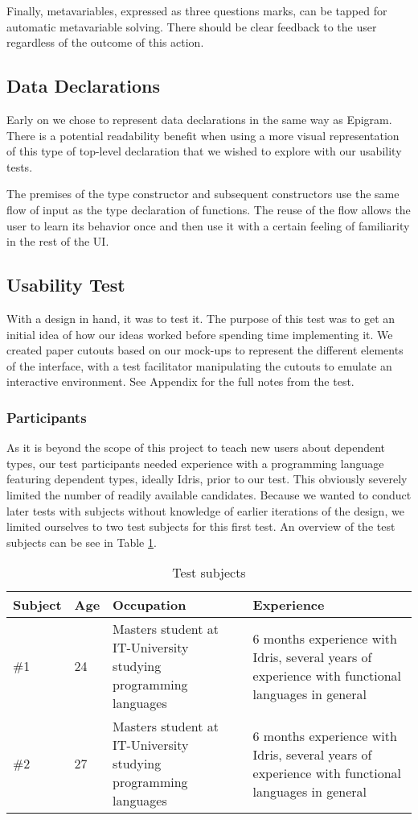 Finally, metavariables,
expressed as three questions marks, can be tapped for automatic metavariable
solving. There should be clear feedback to the user regardless of the outcome
of this action.

\subsection{Data Declarations}
Early on we chose to represent data declarations in the same way as Epigram.
There is a potential readability benefit when using a more visual
representation of this type of top-level declaration that we wished to explore
with our usability tests.

The premises of the type constructor and subsequent constructors use the same flow of input as the type declaration of functions.
The reuse of the flow allows the user to learn its behavior once and then use it with a certain feeling of familiarity
in the rest of the UI.


\subsection{Usability Test}
\label{sec:UsabilityTest}
With a design in hand, it was to test it. The purpose of this test was to get
an initial idea of how our ideas worked before spending time implementing it.
We created paper cutouts based on our mock-ups to represent the different
elements of the interface, with a test facilitator manipulating the cutouts to
emulate an interactive environment. See Appendix  for the full notes
from the test.

\subsubsection{Participants}
As it is beyond the scope of this project to teach new users about dependent
types, our test participants needed experience with a programming language
featuring dependent types, ideally Idris, prior to our test. This obviously
severely limited the number of readily available candidates. Because we wanted
to conduct later tests with subjects without knowledge of earlier iterations of
the design, we limited ourselves to two test subjects for this first test. An
overview of the test subjects can be see in Table \ref{table:first_test_subjects}.

\begin{table}[h]
\centering
\begin{tabular}{| l | l | p{5cm} | p{5cm} |}
\hline
Subject & Age & Occupation & Experience \\ \hline
\#1 & 24 & Masters student at IT-University studying programming languages & 6 months experience with Idris, several years of experience with functional languages in general \\ \hline
\#2 & 27 & Masters student at IT-University studying programming languages & 6 months experience with Idris, several years of experience with functional languages in general \\ \hline
\end{tabular}
\caption {Test subjects}
\label{table:first_test_subjects}
\end{table}

